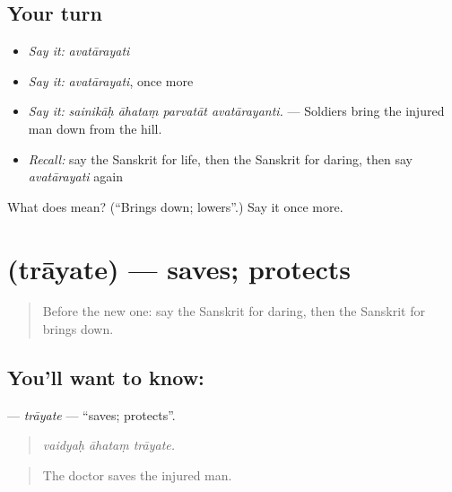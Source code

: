 \subsection*{Your turn}
\begin{itemize}
\raggedright
  \item \emph{Say it:} \emph{avatārayati}
  \item \emph{Say it:} \emph{avatārayati}, once more
  \item \emph{Say it:} \emph{sainikāḥ āhataṃ parvatāt avatārayanti.} — Soldiers bring the injured man down from the hill.
  \item \emph{Recall:} say the Sanskrit for life, then the Sanskrit for daring, then say \emph{avatārayati} again
\end{itemize}

\begin{tcolorbox}[breakable,colback=teal!4,colframe=teal!35!black,title={Before you move on}]
What does  mean? (\textquotedblleft{}Brings down; lowers\textquotedblright{}.) Say it once more.
\end{tcolorbox}
\section[\texorpdfstring{\sk{त्रायते} (trāyate)}{त्रायते (trāyate)}]{ (trāyate) — saves; protects}

\label{lesson:SA-C305-trayate}



\begin{quote}
Before the new one: say the Sanskrit for daring, then the Sanskrit for brings down.
\end{quote}

\subsection*{You'll want to know: }
\textbf{} — \emph{trāyate} — \textquotedblleft{}saves; protects\textquotedblright{}.

\begin{quote}
  
\end{quote}

\begin{quote}
\emph{vaidyaḥ āhataṃ trāyate.}
\end{quote}

\begin{quote}
The doctor saves the injured man.
\end{quote}

